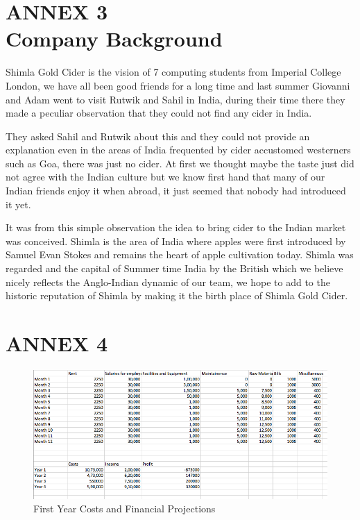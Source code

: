\documentclass[11pt]{article}
\begin{document}
\section{ANNEX 3 \\ Company Background}
Shimla Gold Cider is the vision of 7 computing students from Imperial College
London, we have all been good friends for a long time and last summer Giovanni and
Adam went to visit Rutwik and Sahil in India, during their time there they made
a peculiar observation that they could not find any cider in India.

They asked Sahil and Rutwik about this and they could not provide an explanation
even in the areas of India frequented by cider accustomed westerners such as
Goa, there was just no cider. At first we thought maybe the taste just did not 
agree with the Indian culture but we know first hand that many of our Indian 
friends enjoy it when abroad, it just seemed that nobody had introduced it yet.

It was from this simple observation the idea to bring cider to the Indian market
was conceived. Shimla is the area of India where apples were first introduced by
Samuel Evan Stokes and remains the heart of apple cultivation today. Shimla was
regarded and the capital of Summer time India by the British which we believe
nicely reflects the Anglo-Indian dynamic of our team, we hope to add to the
historic reputation of Shimla by making it the birth place of Shimla Gold Cider.

\newpage


\section{ANNEX 4}

\begin{figure}[H]
	\centering
	\caption{First Year Costs and Financial Projections}
	\includegraphics[width=\textwidth]{costs.png}
\end{figure}

\end{document}
